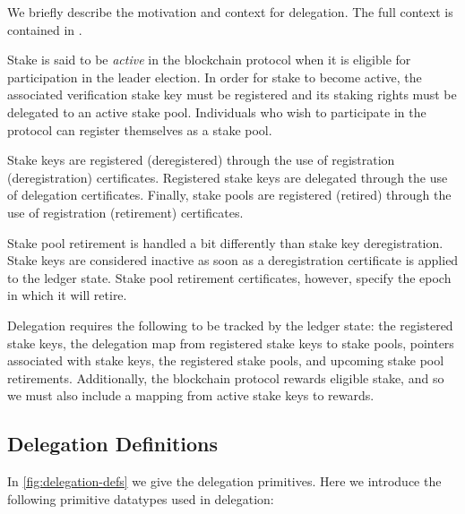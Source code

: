 We briefly describe the motivation and context for delegation.
The full context is contained in \cite{delegation_design}.

Stake is said to be \textit{active} in the blockchain protocol
when it is eligible for participation in the leader election. In order for
stake to become active,
the associated verification stake key must be registered
and its staking rights must be delegated to an active stake pool.
Individuals who wish to participate in the protocol can
register themselves as a stake pool.

Stake keys are registered (deregistered) through the use of
registration (deregistration) certificates.
Registered stake keys are delegated through the use of delegation certificates.
Finally, stake pools are registered (retired) through the use of
registration (retirement) certificates.

Stake pool retirement is handled a bit differently than stake key deregistration.
Stake keys are considered inactive as soon as a deregistration certificate
is applied to the ledger state.
Stake pool retirement certificates, however, specify the epoch in
which it will retire.

Delegation requires the following to be tracked by the ledger state:
the registered stake keys, the delegation map from registered stake keys to stake
pools, pointers associated with stake keys,
the registered stake pools, and upcoming stake pool retirements.
Additionally, the blockchain protocol rewards eligible stake, and so we must
also include a mapping from active stake keys to rewards.

\subsection{Delegation Definitions}
\label{sec:deleg-defs}

In \cref{fig:delegation-defs} we give the delegation primitives.
Here we introduce the following primitive datatypes used in delegation:


